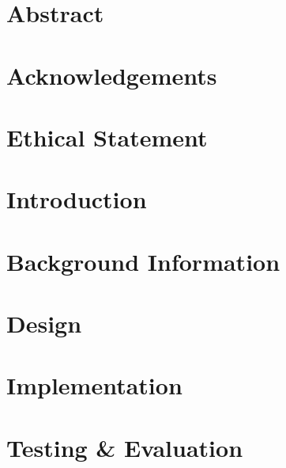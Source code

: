 \documentclass[12pt]{article}
\begin{document}
\pagebreak

\section*{Abstract}


\pagebreak

\section*{Acknowledgements}


\pagebreak

\section*{Ethical Statement}


\pagebreak

\tableofcontents

\pagebreak

\listoffigures
\pagebreak
\listoftables

\pagebreak


\section{Introduction}
\label{introduction}


\section{Background Information}
\label{background}


\section{Design}
\label{design}


\section{Implementation}
\label{implementation}


\section{Testing \& Evaluation}
\label{testing}

\end{document}
